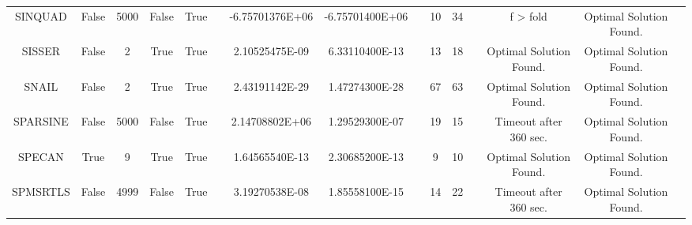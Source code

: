 \begin{longtable}{ccccccccccccccc}
	\cellcolor{default2} SINQUAD& \cellcolor{default2} False& \cellcolor{default2} 5000& \cellcolor{default2} False& \cellcolor{default2} True& \cellcolor{header} & \cellcolor{ok} -6.75701376E+06& \cellcolor{best} -6.75701400E+06& \cellcolor{header} & \cellcolor{best} 10& \cellcolor{poor} 34& \cellcolor{header} & \cellcolor{default2} f > fold& \cellcolor{default2} Optimal Solution Found.& \cellcolor{header} \\
	\cellcolor{default1} SISSER& \cellcolor{default1} False& \cellcolor{default1} 2& \cellcolor{default1} True& \cellcolor{default1} True& \cellcolor{header} & \cellcolor{ok} 2.10525475E-09& \cellcolor{best} 6.33110400E-13& \cellcolor{header} & \cellcolor{best} 13& \cellcolor{ok} 18& \cellcolor{header} & \cellcolor{default1} Optimal Solution Found.& \cellcolor{default1} Optimal Solution Found.& \cellcolor{header} \\
	\cellcolor{default2} SNAIL& \cellcolor{default2} False& \cellcolor{default2} 2& \cellcolor{default2} True& \cellcolor{default2} True& \cellcolor{header} & \cellcolor{best} 2.43191142E-29& \cellcolor{ok} 1.47274300E-28& \cellcolor{header} & \cellcolor{ok} 67& \cellcolor{best} 63& \cellcolor{header} & \cellcolor{default2} Optimal Solution Found.& \cellcolor{default2} Optimal Solution Found.& \cellcolor{header} \\
	\cellcolor{default1} SPARSINE& \cellcolor{default1} False& \cellcolor{default1} 5000& \cellcolor{default1} False& \cellcolor{default1} True& \cellcolor{header} & \cellcolor{poor} 2.14708802E+06& \cellcolor{best} 1.29529300E-07& \cellcolor{header} & \cellcolor{ok} 19& \cellcolor{best} 15& \cellcolor{header} & \cellcolor{default1} Timeout after 360 sec.& \cellcolor{default1} Optimal Solution Found.& \cellcolor{header} \\
	\cellcolor{default2} SPECAN& \cellcolor{default2} True& \cellcolor{default2} 9& \cellcolor{default2} True& \cellcolor{default2} True& \cellcolor{header} & \cellcolor{best} 1.64565540E-13& \cellcolor{ok} 2.30685200E-13& \cellcolor{header} & \cellcolor{best} 9& \cellcolor{ok} 10& \cellcolor{header} & \cellcolor{default2} Optimal Solution Found.& \cellcolor{default2} Optimal Solution Found.& \cellcolor{header} \\
	\cellcolor{default1} SPMSRTLS& \cellcolor{default1} False& \cellcolor{default1} 4999& \cellcolor{default1} False& \cellcolor{default1} True& \cellcolor{header} & \cellcolor{ok} 3.19270538E-08& \cellcolor{best} 1.85558100E-15& \cellcolor{header} & \cellcolor{best} 14& \cellcolor{ok} 22& \cellcolor{header} & \cellcolor{default1} Timeout after 360 sec.& \cellcolor{default1} Optimal Solution Found.& \cellcolor{header} \\

\end{longtable}
